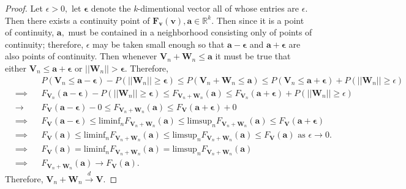 \documentclass[12pt,]{article}
\begin{document}
\begin{proof}
Let $\epsilon>0,$ let $\boldsymbol \epsilon$ denote the \textit{k}-dimentional vector all of whose entries are $\epsilon.$ Then there exists a continuity point of $\boldsymbol{F_v(v)}, \boldsymbol a \in \mathbb{R}^k$. Then  since it is a point of continuity, $\boldsymbol a,$ must be contained in a neighborhood consisting only of points of continuity; therefore, $\epsilon$ may be taken small enough so that $\boldsymbol{a-\epsilon}$ and $\boldsymbol{a+\epsilon}$ are also points of continuity. Then whenever $\boldsymbol V_n + \boldsymbol W_n \le \boldsymbol a$ it must be true that either $\boldsymbol V_n \le \boldsymbol a + \boldsymbol \epsilon$ or $||\boldsymbol W_n || > \boldsymbol\epsilon.$ Therefore, 
\begin{align*}
&& &P( \boldsymbol V_n \le \boldsymbol a - \boldsymbol \epsilon) - P(||\boldsymbol W_n || \ge \boldsymbol\epsilon) \le P(\boldsymbol V_n + \boldsymbol W_n \le \boldsymbol a) \le P(\boldsymbol V_n \le \boldsymbol a + \boldsymbol \epsilon) + P(||\boldsymbol W_n || \ge \epsilon)\\
&\implies& &F_{\boldsymbol V_n} (\boldsymbol a - \boldsymbol \epsilon) - P(||\boldsymbol W_n || \ge \boldsymbol\epsilon) \le F_{\boldsymbol V_n + \boldsymbol W_n} (\boldsymbol a) \le F_{\boldsymbol V_n}(\boldsymbol a + \boldsymbol \epsilon) + P(||\boldsymbol W_n || \ge \epsilon)\\
&\rightarrow &&F_{\boldsymbol V} (\boldsymbol a - \boldsymbol \epsilon) - 0 \le F_{\boldsymbol V_n + \boldsymbol W_n} (\boldsymbol a) \le F_{\boldsymbol V}(\boldsymbol a + \boldsymbol \epsilon) + 0\\
&\implies &&F_{\boldsymbol V} (\boldsymbol a - \boldsymbol \epsilon) \le \text{liminf}_nF_{\boldsymbol V_n + \boldsymbol W_n} (\boldsymbol a) \le \text{limsup}_nF_{\boldsymbol V_n + \boldsymbol W_n} (\boldsymbol a) \le F_{\boldsymbol V}(\boldsymbol a + \boldsymbol \epsilon)\\
&\implies &&F_{\boldsymbol V} (\boldsymbol a) \le \text{liminf}_nF_{\boldsymbol V_n + \boldsymbol W_n} (\boldsymbol a) \le \text{limsup}_nF_{\boldsymbol V_n + \boldsymbol W_n} (\boldsymbol a) \le F_{\boldsymbol V}(\boldsymbol a) \text{    as } \epsilon \rightarrow 0.\\
&\implies &&F_{\boldsymbol V} (\boldsymbol a) = \text{liminf}_nF_{\boldsymbol V_n + \boldsymbol W_n} (\boldsymbol a) = \text{limsup}_nF_{\boldsymbol V_n + \boldsymbol W_n} (\boldsymbol a)\\
&\implies &&F_{\boldsymbol V_n + \boldsymbol W_n} (\boldsymbol a) \rightarrow F_{\boldsymbol V} (\boldsymbol a).
\end{align*}
Therefore, $\boldsymbol V_n + \boldsymbol W_n \overset{d} \rightarrow \boldsymbol V.$
\end{proof}
\end{document}
